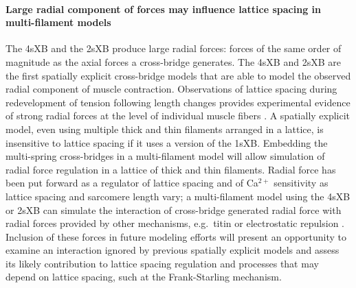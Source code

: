 \documentclass[]{article}
\begin{document}
\paragraph{Large radial component of forces may influence lattice spacing in multi-filament models} %
The 4sXB and the 2sXB produce large radial forces: forces of the same order of magnitude as the axial forces a cross-bridge generates. 
The 4sXB and 2sXB are the first spatially explicit cross-bridge models that are able to model the observed radial component of muscle contraction.
Observations of lattice spacing during redevelopment of tension following length changes provides experimental evidence of strong radial forces at the level of individual muscle fibers \citep{Cecchi1990}. %
A spatially explicit model, even using multiple thick and thin filaments arranged in a lattice, is insensitive to lattice spacing if it uses a version of the 1sXB\@.
Embedding the multi-spring cross-bridges in a multi-filament model will allow simulation of radial force regulation in a lattice of thick and thin filaments.  
Radial force has been put forward as a regulator of lattice spacing and of Ca$^{2+}$ sensitivity as lattice spacing and sarcomere length vary; a multi-filament model using the 4sXB or 2sXB can simulate the interaction of cross-bridge generated radial force with radial forces provided by other mechanisms, e.g.\ titin or electrostatic repulsion \citep{Martyn2004, Cazorla2001, Millman1998}. 
Inclusion of these forces in future modeling efforts will present an opportunity to examine an interaction ignored by previous spatially explicit models and assess its likely contribution to lattice spacing regulation and processes that may depend on lattice spacing, such at the Frank-Starling mechanism. 
\end{document}
